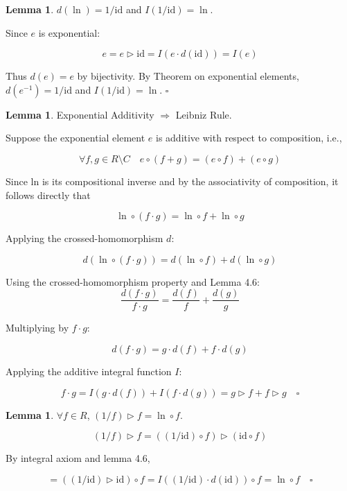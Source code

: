 \documentclass[12pt]{article}
\theoremstyle{definition}
\newtheorem{lemma}[definition]{Lemma}
\begin{document}
\begin{lemma} $d(\ln) = 1/\mathrm{id}$ and $I(1/\mathrm{id}) = \ln$.  

\vspace{5pt}
\noindent Since $e$ is exponential:

\[
e = e \triangleright \mathrm{id} = I(e \cdot d(\mathrm{id})) = I(e)
\]

\vspace{5pt}
Thus $d(e) = e$ by bijectivity. By Theorem on exponential elements, $d(e^{-1}) = 1/\mathrm{id}$ and $I(1/\mathrm{id}) = \ln$. $\square$
\end{lemma}

\vspace{10pt}
\begin{lemma} Exponential Additivity $\Rightarrow$ Leibniz Rule.  

\vspace{5pt}
\noindent Suppose the exponential element $e$ is additive with respect to composition, i.e.,  

\[
\forall f, g \in R \setminus C \quad e \circ (f + g) = (e \circ f) + (e \circ g)
\]

\vspace{5pt}
Since $\mathrm{ln}$ is its compositional inverse and by the associativity of composition, it follows directly that  

\[
\ln \circ (f \cdot g) = \ln \circ f + \ln \circ g
\]

\vspace{5pt}
\noindent Applying the crossed-homomorphism $d$:

\[
d(\ln \circ (f \cdot g)) = d(\ln \circ f) + d(\ln \circ g)
\]

\vspace{5pt}
\noindent Using the crossed-homomorphism property and Lemma 4.6:
\[
\frac{d(f \cdot g)}{f \cdot g} = \frac{d(f)}{f} + \frac{d(g)}{g}
\]

\vspace{5pt}
\noindent Multiplying by $f \cdot g$:

\[
d(f \cdot g) = g \cdot d(f) + f \cdot d(g)
\]

\vspace{5pt}
\noindent Applying the additive integral function $I$:

\[
f \cdot g = I(g \cdot d(f)) + I(f \cdot d(g)) = g \triangleright f + f \triangleright g \quad \square
\]
\end{lemma}

\vspace{5pt}
\begin{lemma} $\forall f \in R$, $(1/f) \triangleright f = \ln \circ f$.  

\[
(1/f) \triangleright f = ((1/\mathrm{id}) \circ f) \triangleright (\mathrm{id} \circ f)
\]

\vspace{5pt}
\noindent By integral axiom and lemma 4.6,

\[
 = ((1/\mathrm{id}) \triangleright \mathrm{id}) \circ f = I((1/\mathrm{id}) \cdot d(\mathrm{id})) \circ f = \ln \circ f \quad \square
\]
\end{lemma}
\end{document}

